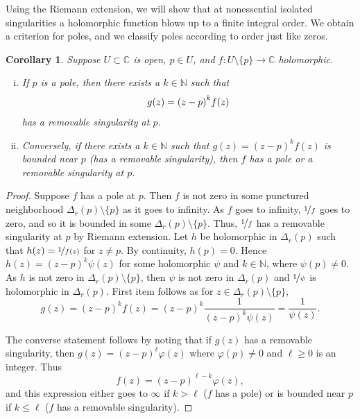 \documentclass[12pt,openany]{book}
\newcommand{\avoidbreak}{\postdisplaypenalty=100}
\newcommand{\C}{{\mathbb{C}}}
\newcommand{\N}{{\mathbb{N}}}
\theoremstyle{plain}
\newtheorem{cor}[thm]{Corollary}
\theoremstyle{remark}
\theoremstyle{definition}
\theoremstyle{exercise}
\theoremstyle{example}
\begin{document}
Using the Riemann extension, we will show that
at nonessential isolated singularities
a holomorphic function blows up to a finite integral order.
We obtain a criterion for poles, and we classify
poles according to order just like zeros.

\begin{cor}
\pagebreak[2]
Suppose $U \subset \C$ is open, $p \in U$,
and $f \colon U \setminus \{p\} \to \C$ holomorphic.
\begin{enumerate}[(i)]
\item
If $p$ is a pole, then there exists a $k \in \N$ such that
\begin{equation*}
g(z) = {(z-p)}^k f(z)
\avoidbreak
\end{equation*}
has a removable singularity at $p$.
\item
Conversely, if there exists a $k \in \N$ such that
$g(z) = {(z-p)}^k f(z)$ is bounded near $p$ (has a removable singularity),
then $f$ has a pole or a
removable singularity at $p$.
\end{enumerate}
\end{cor}

\begin{proof}
Suppose $f$ has a pole at $p$.
Then $f$ is not zero in some
punctured neighborhood $\Delta_r(p) \setminus \{p\}$ as it goes to infinity.
As $f$ goes to infinity,
$\nicefrac{1}{f}$ goes to zero, and so it is bounded in some $\Delta_r(p)
\setminus \{p\}$.
Thus, $\nicefrac{1}{f}$ has a removable singularity at $p$ by Riemann extension.
Let $h$ be holomorphic in $\Delta_r(p)$
such that $h(z) = \nicefrac{1}{f(z)}$ for $z \not= p$.  By continuity, $h(p) =
0$.  Hence $h(z) = {(z-p)}^k \psi(z)$ for some holomorphic $\psi$ and $k \in \N$,
where $\psi(p) \not= 0$.
As $h$ is not zero in $\Delta_r(p) \setminus \{p\}$,
then $\psi$ is not zero in $\Delta_r(p)$
and $\nicefrac{1}{\psi}$ is holomorphic in $\Delta_r(p)$.
First item follows as
for $z \in \Delta_r(p) \setminus \{p\}$,
\begin{equation*}
g(z) = {(z-p)}^k f(z)
=
{(z-p)}^k \frac{1}{{(z-p)}^k \psi(z)}
=
\frac{1}{\psi(z)} .
\end{equation*}

The converse statement follows by noting that if $g(z)$ has a removable
singularity, then $g(z) = {(z-p)}^\ell \varphi(z)$ where
$\varphi(p) \not= 0$ and $\ell \geq 0$ is an integer.
Thus
\begin{equation*}
f(z) = {(z-p)}^{\ell-k} \varphi(z) ,
\end{equation*}
and this expression either goes to $\infty$ if $k > \ell$ ($f$ has a pole) or is
bounded near $p$ if $k \leq \ell$ ($f$ has a removable singularity).
\end{proof}
\end{document}
